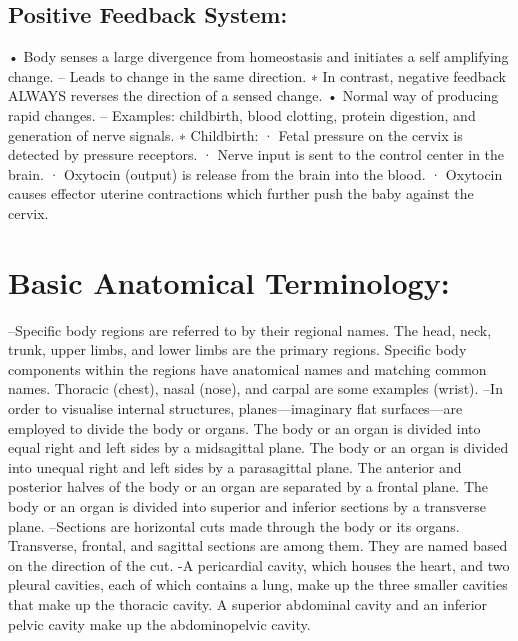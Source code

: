\documentclass[12pt]{article}
\begin{document}
\subsection{Positive Feedback System:}
\newline• Body senses a large divergence from homeostasis and initiates a self amplifying change.
\newline– Leads to change in the same direction.
\newline∗ In contrast, negative feedback ALWAYS reverses the direction of
a sensed change.
\newline• Normal way of producing rapid changes.
\newline– Examples: childbirth, blood clotting, protein digestion, and generation of nerve signals.
\newline∗ Childbirth:
\newline· Fetal pressure on the cervix is detected by pressure receptors.
\newline· Nerve input is sent to the control center in the brain.
\newline· Oxytocin (output) is release from the brain into the blood.
\newline· Oxytocin causes effector uterine contractions which further
push the baby against the cervix.
\section{Basic Anatomical Terminology:}
\newline–Specific body regions are referred to by their regional names. The head, neck, trunk, upper limbs, and lower limbs are the primary regions. Specific body components within the regions have anatomical names and matching common names. Thoracic (chest), nasal (nose), and carpal are some examples (wrist).
\newline–In order to visualise internal structures, planes—imaginary flat surfaces—are employed to divide the body or organs. The body or an organ is divided into equal right and left sides by a midsagittal plane. The body or an organ is divided into unequal right and left sides by a parasagittal plane. The anterior and posterior halves of the body or an organ are separated by a frontal plane. The body or an organ is divided into superior and inferior sections by a transverse plane.
\newline–Sections are horizontal cuts made through the body or its organs. Transverse, frontal, and sagittal sections are among them. They are named based on the direction of the cut.
\newline-A pericardial cavity, which houses the heart, and two pleural cavities, each of which contains a lung, make up the three smaller cavities that make up the thoracic cavity. A superior abdominal cavity and an inferior pelvic cavity make up the abdominopelvic cavity.
\end{document}
